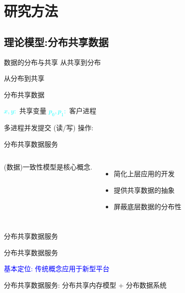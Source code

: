 \section{研究方法}

\subsection{理论模型:分布共享数据}

\begin{frame}{数据的分布与共享}
  从共享到分布

  从分布到共享
\end{frame}
\begin{frame}{分布共享数据}
  \begin{center}
    \textcolor{cyan}{$x, y:$} 共享变量 \hspace{0.30cm} \textcolor{cyan}{$p_0, p_1:$} 
    客户进程
  \end{center}

  多进程并发提交 (读/写) 操作:
  

  \begin{center}
  \end{center}

\end{frame}
\begin{frame}{分布共享数据服务}
  \begin{columns}
	  (数据)一致性模型是核心概念.
	  \begin{itemize}[<+->]
		\setlength\itemsep{10pt}
		\item 简化上层应用的开发
		\item 提供共享数据的抽象
		\item 屏蔽底层数据的分布性
	  \end{itemize}
  \end{columns}
\end{frame}
\begin{frame}{分布共享数据服务}
\end{frame}
\begin{frame}{分布共享数据服务}
  \begin{center}
    \textcolor{blue}{\large 基本定位: 传统概念应用于新型平台}
  \end{center}

  \vspace{0.20cm}
  \begin{center}
    分布共享数据服务: 分布共享内存模型 + 分布数据系统
  \end{center}
\end{frame}
